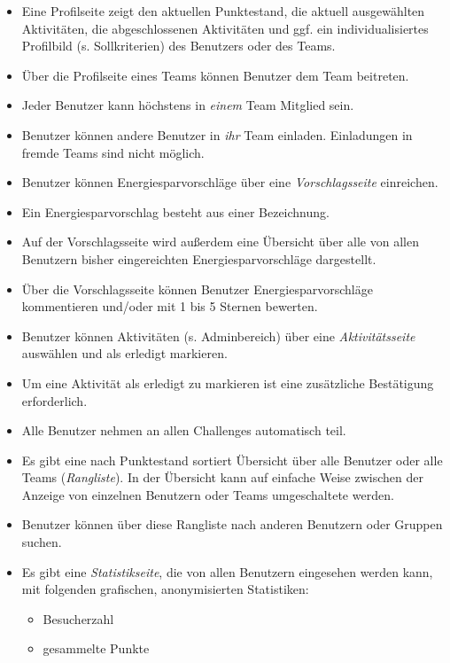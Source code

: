 \documentclass[10pt,a4paper]{article}
\begin{document}
\begin{itemize}
\begin{itemize}
                        \item Eine Profilseite zeigt den aktuellen Punktestand, die aktuell ausgewählten Aktivitäten, die abgeschlossenen Aktivitäten und ggf. ein individualisiertes Profilbild (s. Sollkriterien) des Benutzers oder des Teams.
                        \item Über die Profilseite eines Teams können Benutzer dem Team beitreten.
                        \item Jeder Benutzer kann höchstens in \emph{einem} Team Mitglied sein.
                        \item Benutzer können andere Benutzer in \emph{ihr} Team einladen. Einladungen in fremde Teams sind nicht möglich.
			\item Benutzer können Energiesparvorschläge über eine \emph{Vorschlagsseite} einreichen.
                        \item Ein Energiesparvorschlag besteht aus einer Bezeichnung.
                        \item Auf der Vorschlagsseite wird außerdem eine Übersicht über alle von allen Benutzern bisher eingereichten Energiesparvorschläge dargestellt.
                        \item Über die Vorschlagsseite können Benutzer Energiesparvorschläge kommentieren und/oder mit 1 bis 5 Sternen bewerten.
			\item Benutzer können Aktivitäten (s. Adminbereich) über eine \emph{Aktivitätsseite} auswählen und als erledigt markieren.
                        \item Um eine Aktivität als erledigt zu markieren ist eine zusätzliche Bestätigung erforderlich.
			\item Alle Benutzer nehmen an allen Challenges automatisch teil.
			\item Es gibt eine nach Punktestand sortiert Übersicht über alle Benutzer oder alle Teams (\emph{Rangliste}). In der Übersicht kann auf einfache Weise zwischen der Anzeige von einzelnen Benutzern oder Teams umgeschaltete werden.
                        \item Benutzer können über diese Rangliste nach anderen Benutzern oder Gruppen suchen.
			\item Es gibt eine \emph{Statistikseite}, die von allen Benutzern eingesehen werden kann, mit folgenden grafischen, anonymisierten Statistiken:
			\begin{itemize}
				\item Besucherzahl
				\item gesammelte Punkte

\end{itemize}
\end{itemize}
\end{itemize}
\end{document}
